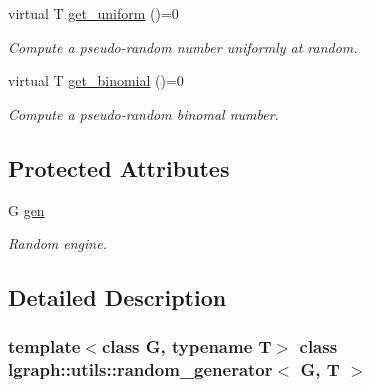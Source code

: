 \begin{DoxyCompactItemize}
\mbox{\label{classlgraph_1_1utils_1_1random__generator_ac18bd12c8baf8a7cbe6ef9be072c95cf}} 
virtual T \hyperlink{classlgraph_1_1utils_1_1random__generator_ac18bd12c8baf8a7cbe6ef9be072c95cf}{get\+\_\+uniform} ()=0
\begin{DoxyCompactList}\small\item\em Compute a pseudo-\/random number uniformly at random. \end{DoxyCompactList}\item 
\mbox{\label{classlgraph_1_1utils_1_1random__generator_a721da14c38e38d28559e8c617e0bdde2}} 
virtual T \hyperlink{classlgraph_1_1utils_1_1random__generator_a721da14c38e38d28559e8c617e0bdde2}{get\+\_\+binomial} ()=0
\begin{DoxyCompactList}\small\item\em Compute a pseudo-\/random binomal number. \end{DoxyCompactList}\end{DoxyCompactItemize}
\subsection*{Protected Attributes}
\begin{DoxyCompactItemize}
\item 
\mbox{\label{classlgraph_1_1utils_1_1random__generator_a18353876b4c2d3a18aee454b5750a0a0}} 
G \hyperlink{classlgraph_1_1utils_1_1random__generator_a18353876b4c2d3a18aee454b5750a0a0}{gen}
\begin{DoxyCompactList}\small\item\em Random engine. \end{DoxyCompactList}\end{DoxyCompactItemize}


\subsection{Detailed Description}
\subsubsection*{template$<$class G, typename T$>$\newline
class lgraph\+::utils\+::random\+\_\+generator$<$ G, T $>$}

